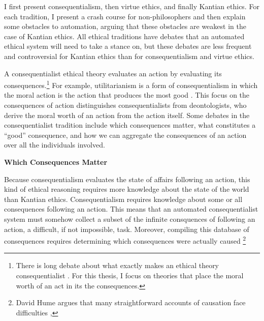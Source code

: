 \begin{isabellebody}
\begin{isamarkuptext}
I first present consequentialism, then virtue ethics, and finally Kantian ethics. For each 
tradition, I present a crash course for non-philosophers and then explain some obstacles to automation, 
arguing that these obstacles are weakest in the case of Kantian ethics. All ethical traditions have debates that an 
automated ethical system will need to take a stance on, but these debates are less frequent and controversial
for Kantian ethics than for consequentialism and virtue ethics.%
\end{isamarkuptext}\isamarkuptrue%
%
\isadelimdocument
%
\endisadelimdocument
%
\isatagdocument
%
\isamarkuptrue%
%
\endisatagdocument
{\isafolddocument}%
%
\isadelimdocument
%
\endisadelimdocument
%
\begin{isamarkuptext}%
A consequentialist ethical theory evaluates an 
action by evaluating its consequences.\footnote{There is long debate about what exactly makes an ethical theory consequentialist \citep{consequentialismsep}. 
For this thesis, I focus on theories that place the moral worth of an act in its the consequences.} For example, 
utilitarianism is a form of consequentialism in which the moral action 
is the action that produces the most good \citep{utilsep}. This focus
on the consequences of action distinguishes consequentialists from deontologists, who derive the moral worth
of an action from the action itself. Some debates in the consequentialist tradition include 
which consequences matter, what constitutes a ``good'' consequence, and how we can 
aggregate the consequences of an action over all the individuals involved.%
\end{isamarkuptext}\isamarkuptrue%
%
\begin{isamarkuptext}%
\noindent \textbf{Which Consequences Matter}%
\end{isamarkuptext}\isamarkuptrue%
%
\begin{isamarkuptext}%
Because consequentialism evaluates the state of affairs following an action, this kind of ethical 
reasoning requires more knowledge about the state of the world than Kantian ethics. Consequentialism
requires knowledge about some or all consequences following an action. This means that an automated 
consequentialist system must somehow collect a subset of the infinite consquences of following an action, a difficult, 
if not impossible, task. Moreover, compiling this database of consequences requires 
determining which consequences were actually caused \footnote
{David Hume argues that many straightforward accounts of causation face difficulties \citep{hume}, 
}
\end{isamarkuptext}
\end{isabellebody}
